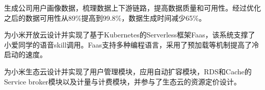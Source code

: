 \documentclass{resume}
\begin{document}
\begin{onehalfspacing}
生成公司用户画像数据，梳理数据上下游链路，提高数据质量和可用性。经过优化之后的数据可用性从89\%提高到99.8\%，数据生成时间减少65\%。
\end{onehalfspacing}



\begin{onehalfspacing}
为小米开放云设计并实现了基于Kubernetes的Serverless框架Faas，该系统支撑了小爱同学的语音skill调用。Faas支持多种编程语言，采用了预加载等机制提高了冷启动的速度。
\end{onehalfspacing}



为小米生态云设计并实现了用户管理模块，应用自动扩容模块，RDS和Cache的Service broker模块以及计量与计费模块，并参与了生态云的资源定价设计。
\end{document}

